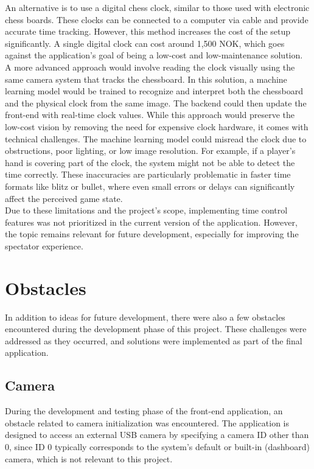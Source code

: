 An alternative is to use a digital chess clock, similar to those used with electronic chess boards. These clocks can be connected to a computer via cable and provide accurate time tracking. However, this method increases the cost of the setup significantly. A single digital clock can cost around 1,500 NOK, which goes against the application’s goal of being a low-cost and low-maintenance solution. \\

A more advanced approach would involve reading the clock visually using the same camera system that tracks the chessboard. In this solution, a machine learning model would be trained to recognize and interpret both the chessboard and the physical clock from the same image. The backend could then update the front-end with real-time clock values. While this approach would preserve the low-cost vision by removing the need for expensive clock hardware, it comes with technical challenges. The machine learning model could misread the clock due to obstructions, poor lighting, or low image resolution. For example, if a player’s hand is covering part of the clock, the system might not be able to detect the time correctly. These inaccuracies are particularly problematic in faster time formats like blitz or bullet, where even small errors or delays can significantly affect the perceived game state. \\

Due to these limitations and the project's scope, implementing time control features was not prioritized in the current version of the application. However, the topic remains relevant for future development, especially for improving the spectator experience.

\section{Obstacles}
In addition to ideas for future development, there were also a few obstacles encountered during the development phase of this project. These challenges were addressed as they occurred, and solutions were implemented as part of the final application.

\subsection{Camera}
During the development and testing phase of the front-end application, an obstacle related to camera initialization was encountered. The application is designed to access an external USB camera by specifying a camera ID other than 0, since ID 0 typically corresponds to the system's default or built-in (dashboard) camera, which is not relevant to this project.\\

